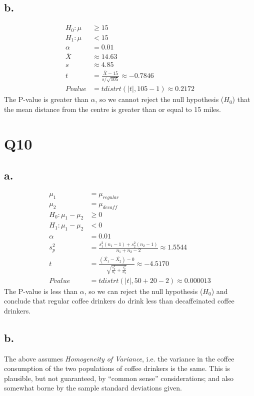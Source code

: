 \documentclass[11pt,a4paper]{article}
\begin{document}
\subsection*{b.}
\begin{align*}
H_0: \mu &\geq 15 \\
H_1: \mu &< 15 \\
\alpha &= 0.01 \\
\overline{X} &\approx 14.63 \\
s &\approx 4.85 \\
t &= \frac{\overline{X} - 15}{s/\sqrt{105}} \approx -0.7846 \\
Pvalue &= tdistrt(|t|, 105-1) \approx 0.2172
\end{align*}
The P-value is greater than $\alpha$, so we cannot reject the null hypothesis ($H_0$) that
the mean distance from the centre is greater than or equal to 15 miles.
\section*{Q10}
\subsection*{a.}
\begin{align*}
\mu_1 &= \mu_{regular} \\
\mu_2 &= \mu_{decaff} \\
H_0: \mu_1 - \mu_2 &\geq 0 \\
H_1: \mu_1 - \mu_2 &< 0 \\
\alpha &= 0.01 \\
s_p^2 &= \frac{s_1^2(n_1-1)+s_2^2(n_2-1)}{n_1+n_2-2} \approx 1.5544 \\
t &= \frac{(\overline{X_1}-\overline{X_2})-0}{\sqrt{\frac{s_p^2}{n_1}+\frac{s_p^2}{n_2}}}
  \approx -4.5170 \\
Pvalue &= tdistrt(|t|, 50+20-2) \approx 0.000013
\end{align*}
The P-value is less than $\alpha$, so we can reject the null hypothesis ($H_0$) and conclude
that regular coffee drinkers do drink less than decaffeinated coffee drinkers.
\subsection*{b.}
The above assumes \textit{Homogeneity of Variance}, i.e. the variance in the coffee consumption
of the two populations of coffee drinkers is the same. This is plausible, but not guaranteed,
by ``common sense'' considerations; and also somewhat borne by the sample standard deviations
given.
\end{document}
